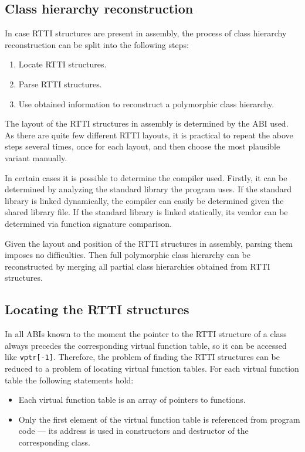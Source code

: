 \documentclass[times, 10pt,twocolumn]{article}
\begin{document}
\subsection{Class hierarchy reconstruction}

In case RTTI structures are present in assembly,
the process of class hierarchy reconstruction can be split
into the following steps:

\begin{enumerate}\compact
\item Locate RTTI structures.
\item Parse RTTI structures.
\item Use obtained information to reconstruct a polymorphic class hierarchy.
\end{enumerate}

The layout of the RTTI structures in assembly is determined
by the ABI used.
As there are quite few different RTTI layouts,
it is practical to repeat the above steps several times,
once for each layout,
and then choose the most plausible variant manually.

In certain cases it is possible to determine the compiler used.
%
Firstly, it can be determined by analyzing the standard library
the program uses. If the standard library is linked dynamically,
the compiler can easily be determined given the shared library file.
If the standard library is linked statically,
its vendor can be determined via function signature comparison.

Given the layout and position of the RTTI structures in assembly,
parsing them imposes no difficulties.
Then full polymorphic class hierarchy
can be reconstructed by merging all partial class hierarchies
obtained from RTTI structures.

\subsection{Locating the RTTI structures}

In all ABIs known to the moment the pointer to the RTTI structure
of a class always precedes the corresponding virtual function table,
so it can be accessed like \verb|vptr[-1]|.
Therefore, the problem of finding the RTTI structures can be reduced
to a problem of locating virtual function tables.
For each virtual function table the following statements hold:
\begin{itemize}\compact
\item Each virtual function table is an array of pointers to functions.
\item Only the first element of the virtual function table
is referenced from program code --- its address
is used in constructors and destructor of the corresponding class. 
\end{itemize}
\end{document}
